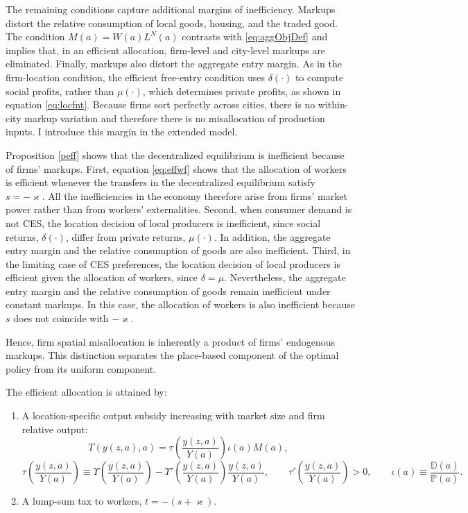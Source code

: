 The remaining conditions capture additional margins of inefficiency. Markups distort the relative consumption of local goods, housing, and the traded good. The condition $M(a)=W(a)L^N(a)$ contrasts with \eqref{eq:aggObjDef} and implies that, in an efficient allocation, firm-level and city-level markups are eliminated. Finally, markups also distort the aggregate entry margin. As in the firm-location condition, the efficient free-entry condition uses $\delta(\cdot)$ to compute social profits, rather than $\mu(\cdot)$, which determines private profits, as shown in equation \eqref{eq:locfnt}. Because firms sort perfectly across cities, there is no within-city markup variation and therefore there is no misallocation of production inputs. I introduce this margin in the extended model.

Proposition \ref{peff} shows that the decentralized equilibrium is inefficient because of firms’ markups. First, equation \eqref{eq:effwf} shows that the allocation of workers is efficient whenever the transfers in the decentralized equilibrium satisfy $s = -\varkappa$. All the inefficiencies in the economy therefore arise from firms’ market power rather than from workers’ externalities. Second, when consumer demand is not CES, the location decision of local producers is inefficient, since social returns, $\delta(\cdot)$, differ from private returns, $\mu(\cdot)$. In addition, the aggregate entry margin and the relative consumption of goods are also inefficient. Third, in the limiting case of CES preferences, the location decision of local producers is efficient given the allocation of workers, since $\delta = \mu$. Nevertheless, the aggregate entry margin and the relative consumption of goods remain inefficient under constant markups. In this case, the allocation of workers is also inefficient because $s$ does not coincide with $-\varkappa$.

Hence, firm spatial misallocation is inherently a product of firms’ endogenous markups. This distinction separates the place-based component of the optimal policy from its uniform component.

\begin{prop}\label{p5}
The efficient allocation is attained by:
    \begin{enumerate}
    \item A location-specific output subsidy increasing with market size and firm relative output:
    \begin{equation}\label{eq:opttransf}
    T(y(z,a), a) = \tau\left(\frac{y(z,a)}{Y(a)}\right) \iota(a) M(a),
    \end{equation}
    \begin{equation*}
    \tau\left(\frac{y(z,a)}{Y(a)}\right) \equiv \Upsilon\left(\frac{y(z,a)}{Y(a)}\right) - \Upsilon'\left(\frac{y(z,a)}{Y(a)}\right)  \frac{y(z,a)}{Y(a)}, \qquad  \tau'\left(\frac{y(z,a)}{Y(a)}\right) > 0, \qquad \iota(a) \equiv \frac{\mathbb{D}(a)}{\mathbb{P}(a)}.
    \end{equation*}
    \item A lump-sum tax to workers, $t = -(s + \varkappa)$.
    \end{enumerate}
\end{prop}

